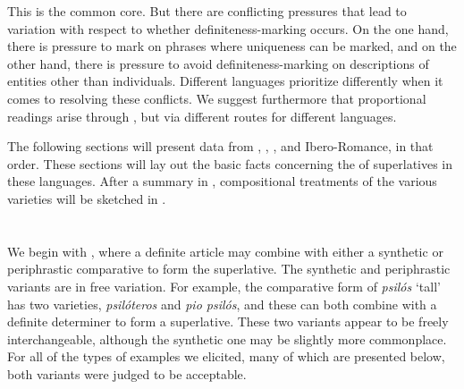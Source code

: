 \documentclass[output=paper
,modfonts
,nonflat]{langsci/langscibook}
\begin{document}
This is the common core. But there are conflicting pressures that lead to variation with respect to whether definiteness-marking occurs. On the one hand, there is pressure to mark  on phrases where uniqueness can be marked, and on the other hand, there is pressure to avoid definiteness-marking on descriptions of entities other than individuals. Different languages prioritize differently when it comes to resolving these conflicts. We suggest furthermore that proportional readings arise through , but via different routes for different languages.

The following sections will present data from , , , and Ibero-Romance, in that order. These sections will lay out the basic facts concerning the  of superlatives in these languages. After a summary in , compositional treatments of the various varieties will be sketched in .

\section{} \label{sec:coppockstrand:2}

We begin with , where a definite article may combine with either a synthetic or periphrastic comparative to form the superlative. The
synthetic and periphrastic variants are in free variation. For example, the comparative form of \textit{psilós} `tall' has two varieties, \textit{psilóteros} and \textit{pio psilós}, and these can both combine with a definite determiner to form a superlative. These two variants appear to be freely interchangeable, although the synthetic one may be slightly more commonplace. For all of the types of examples we elicited, many of which are presented below, both variants were judged to be acceptable.
\end{document}
